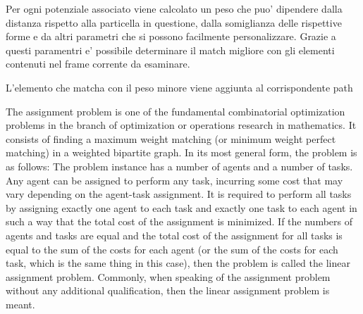 \documentclass[conference]{IEEEtran}
\begin{document}
Per ogni potenziale associato viene calcolato un peso che puo' dipendere dalla distanza rispetto alla particella in questione, dalla somiglianza delle rispettive forme e da altri parametri che si possono facilmente personalizzare. Grazie a questi paramentri e' possibile determinare  il match migliore con gli elementi contenuti nel frame corrente da esaminare.

L'elemento che matcha con il peso minore viene aggiunta al corrispondente path

The assignment problem is one of the fundamental combinatorial optimization problems in the branch of optimization or operations research in mathematics. It consists of finding a maximum weight matching (or minimum weight perfect matching) in a weighted bipartite graph.
In its most general form, the problem is as follows:
The problem instance has a number of agents and a number of tasks. Any agent can be assigned to perform any task, incurring some cost that may vary depending on the agent-task assignment. It is required to perform all tasks by assigning exactly one agent to each task and exactly one task to each agent in such a way that the total cost of the assignment is minimized.
If the numbers of agents and tasks are equal and the total cost of the assignment for all tasks is equal to the sum of the costs for each agent (or the sum of the costs for each task, which is the same thing in this case), then the problem is called the linear assignment problem. Commonly, when speaking of the assignment problem without any additional qualification, then the linear assignment problem is meant.
\end{document}
